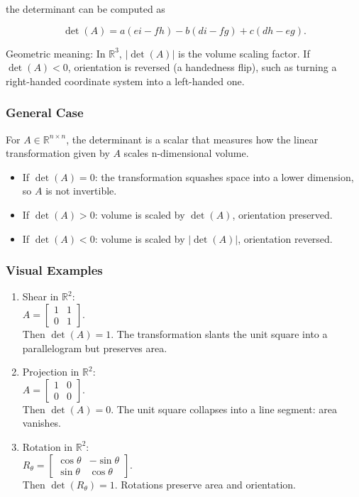 \documentclass[
  12pt,
  a4paper,
]{article}
\begin{document}
the determinant can be computed as

\[\det(A) = a(ei - fh) - b(di - fg) + c(dh - eg).\]

Geometric meaning: In \(\mathbb{R}^3\), \(|\det(A)|\) is the volume
scaling factor. If \(\det(A) < 0\), orientation is reversed (a
handedness flip), such as turning a right-handed coordinate system into
a left-handed one.

\subsubsection{General Case}\label{general-case}

For \(A \in \mathbb{R}^{n \times n}\), the determinant is a scalar that
measures how the linear transformation given by \(A\) scales
n-dimensional volume.

\begin{itemize}
\item
  If \(\det(A) = 0\): the transformation squashes space into a lower
  dimension, so \(A\) is not invertible.
\item
  If \(\det(A) > 0\): volume is scaled by \(\det(A)\), orientation
  preserved.
\item
  If \(\det(A) < 0\): volume is scaled by \(|\det(A)|\), orientation
  reversed.
\end{itemize}

\subsubsection{Visual Examples}\label{visual-examples}

\begin{enumerate}
\def\labelenumi{\arabic{enumi}.}
\item
  Shear in \(\mathbb{R}^2\):\\
  \(A = \begin{bmatrix} 1 & 1 \\ 0 & 1 \end{bmatrix}\).\\
  Then \(\det(A) = 1\). The transformation slants the unit square into a
  parallelogram but preserves area.
\item
  Projection in \(\mathbb{R}^2\):\\
  \(A = \begin{bmatrix} 1 & 0 \\ 0 & 0 \end{bmatrix}\).\\
  Then \(\det(A) = 0\). The unit square collapses into a line segment:
  area vanishes.
\item
  Rotation in \(\mathbb{R}^2\):\\
  \(R_\theta = \begin{bmatrix} \cos\theta & -\sin\theta \\ \sin\theta & \cos\theta \end{bmatrix}\).\\
  Then \(\det(R_\theta) = 1\). Rotations preserve area and orientation.
\end{enumerate}
\end{document}
